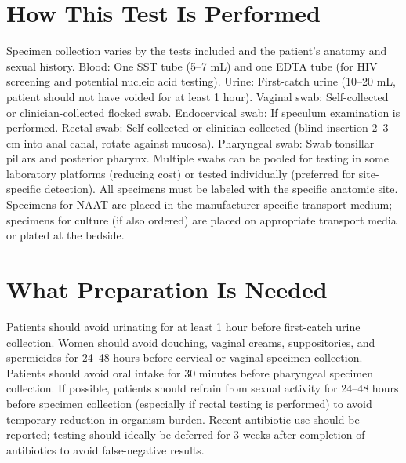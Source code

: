 \section*{How This Test Is Performed}
Specimen collection varies by the tests included and the patient's anatomy and sexual history. Blood: One SST tube (5--7 mL) and one EDTA tube (for HIV screening and potential nucleic acid testing). Urine: First-catch urine (10--20 mL, patient should not have voided for at least 1 hour). Vaginal swab: Self-collected or clinician-collected flocked swab. Endocervical swab: If speculum examination is performed. Rectal swab: Self-collected or clinician-collected (blind insertion 2--3 cm into anal canal, rotate against mucosa). Pharyngeal swab: Swab tonsillar pillars and posterior pharynx. Multiple swabs can be pooled for testing in some laboratory platforms (reducing cost) or tested individually (preferred for site-specific detection). All specimens must be labeled with the specific anatomic site. Specimens for NAAT are placed in the manufacturer-specific transport medium; specimens for culture (if also ordered) are placed on appropriate transport media or plated at the bedside.

\section*{What Preparation Is Needed}
Patients should avoid urinating for at least 1 hour before first-catch urine collection. Women should avoid douching, vaginal creams, suppositories, and spermicides for 24--48 hours before cervical or vaginal specimen collection. Patients should avoid oral intake for 30 minutes before pharyngeal specimen collection. If possible, patients should refrain from sexual activity for 24--48 hours before specimen collection (especially if rectal testing is performed) to avoid temporary reduction in organism burden. Recent antibiotic use should be reported; testing should ideally be deferred for 3 weeks after completion of antibiotics to avoid false-negative results.

